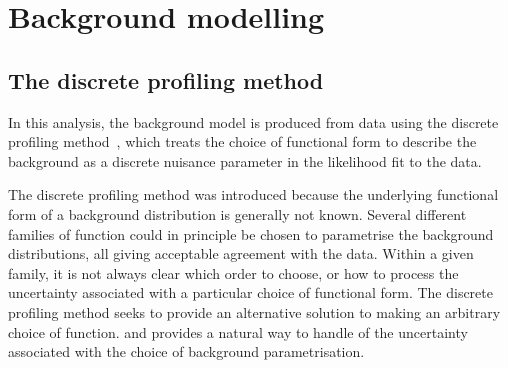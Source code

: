 

\section{Background modelling}
\label{model:sec:background_model}
\subsection{The discrete profiling method}

In this analysis, the background model is produced from data using the discrete profiling method~\cite{DiscreteProfiling}, which treats the choice of functional form to describe the background as a discrete nuisance parameter in the likelihood fit to the data. 

The discrete profiling method was introduced because the underlying functional form of a background distribution is generally not known. Several different families of function could in principle be chosen to parametrise the background distributions, all giving acceptable agreement with the data. Within a given family, it is not always clear which order to choose, or how to process the uncertainty associated with a particular choice of functional form.  %
The discrete profiling method seeks to provide an alternative solution to making an arbitrary choice of function. %
and provides a natural way to handle of the uncertainty associated with the choice of background parametrisation. 

